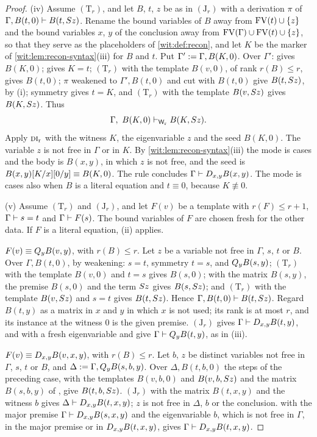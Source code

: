 \begin{proof}
(iv) Assume $(\mathrm T_r)$, and let $B$, $t$, $z$ be as in $(\mathrm J_r)$
with a derivation $\pi$ of $\Gamma,B(t,0)\vdash B(t,S z)$.  Rename the
bound variables of $B$ away from $\operatorname{FV}(t)\cup\{z\}$ and the bound variables
$x$, $y$ of the conclusion away from $\operatorname{FV}(\Gamma)\cup\operatorname{FV}(t)\cup\{z\}$, so that
they serve as the placeholders of \cref{wit:def:recon}, and let $K$ be the
marker of
\cref{wit:lem:recon-syntax}(iii) for $B$ and $t$.  Put
$\Gamma'\mathrel{:=}\Gamma,B(K,0)$.  Over $\Gamma'$:  gives $B(K,0)$;
 gives $K=t$; $(\mathrm T_r)$ with the template $B(v,0)$, of rank
$r(B)\le r$, gives $B(t,0)$; $\pi$ weakened to $\Gamma',B(t,0)$ and cut with
$B(t,0)$ give $B(t,S z)$, by (i); symmetry gives $t=K$, and $(\mathrm T_r)$
with the template $B(v,S z)$ gives $B(K,S z)$.  Thus
\[
 \Gamma,\ B(K,0)\vdash_{\mathsf{W}_{\mathrm r}}B(K,S z).
\]
Apply $\rulename{DI}_{\mathrm{r}}$ with the witness $K$, the eigenvariable $z$
and the seed $B(K,0)$.  The variable $z$ is not free in $\Gamma$ or in $K$.
By \cref{wit:lem:recon-syntax}(iii) the mode is cases and the body is $B(x,y)$,
in which $z$ is not free, and the seed is
$B(x,y)[K/x][0/y]\equiv B(K,0)$.  The rule concludes
$\Gamma\vdash D_{x,y}B(x,y)$.  The mode is cases also when $B$ is a literal
equation and $t\equiv 0$, because $K\not\equiv 0$.

(v) Assume $(\mathrm T_r)$ and $(\mathrm J_r)$, and let $F(v)$ be a template
with $r(F)\le r+1$, $\Gamma\vdash s=t$ and $\Gamma\vdash F(s)$.  The bound
variables of $F$ are chosen fresh for the other data.  If $F$ is a literal
equation, (ii) applies.

\emph{$F(v)\equiv Q_{y}B(v,y)$}, with $r(B)\le r$.  Let $z$ be a variable not
free in $\Gamma$, $s$, $t$ or $B$.  Over $\Gamma,B(t,0)$, by weakening: $s=t$,
symmetry $t=s$, and $Q_{y}B(s,y)$; $(\mathrm T_r)$ with the template $B(v,0)$
and $t=s$ gives $B(s,0)$;  with the matrix $B(s,y)$, the premise
$B(s,0)$ and the term $S z$ gives $B(s,S z)$; and $(\mathrm T_r)$ with
the template $B(v,S z)$ and $s=t$ gives $B(t,S z)$.  Hence
$\Gamma,B(t,0)\vdash B(t,S z)$.  Regard $B(t,y)$ as a matrix in $x$ and
$y$ in which $x$ is not used; its rank is at most $r$, and its instance at
the witness $0$ is the given premise.  $(\mathrm J_r)$ gives
$\Gamma\vdash D_{x,y}B(t,y)$, and  with a fresh eigenvariable
and  give $\Gamma\vdash Q_{y}B(t,y)$, as in (iii).

\emph{$F(v)\equiv D_{x,y}B(v,x,y)$}, with $r(B)\le r$.  Let $b$, $z$ be distinct
variables not free in $\Gamma$, $s$, $t$ or $B$, and
$\Delta\mathrel{:=}\Gamma,Q_{y}B(s,b,y)$.  Over $\Delta,B(t,b,0)$ the steps of the
preceding case, with the templates $B(v,b,0)$ and $B(v,b,S z)$ and the
matrix $B(s,b,y)$ of , give $B(t,b,S z)$.  $(\mathrm J_r)$ with
the matrix $B(t,x,y)$ and the witness $b$ gives
$\Delta\vdash D_{x,y}B(t,x,y)$; $z$ is not free in $\Delta$, $b$ or the
conclusion.   with the major premise
$\Gamma\vdash D_{x,y}B(s,x,y)$ and the eigenvariable $b$, which is not free in
$\Gamma$, in the major premise or in $D_{x,y}B(t,x,y)$, gives
$\Gamma\vdash D_{x,y}B(t,x,y)$.


\end{proof}
